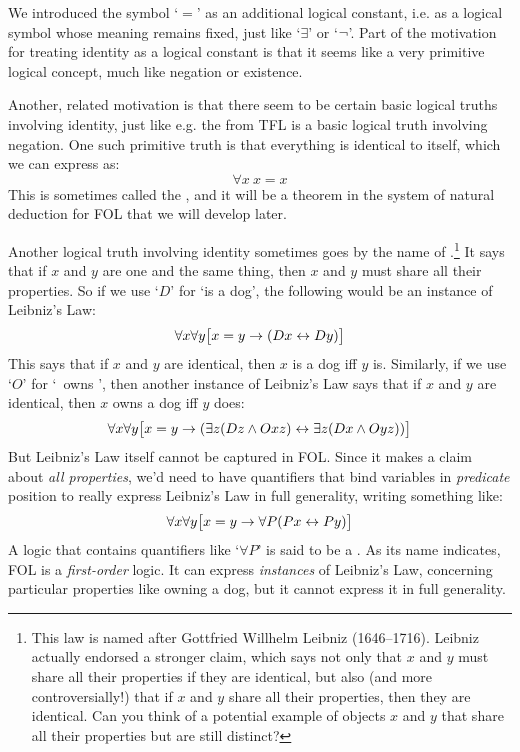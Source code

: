 We introduced the symbol `$=$' as an additional logical constant, i.e. as a logical symbol whose meaning remains fixed, just like `$\exists$' or `$\neg$'.  Part of the motivation for treating identity as a logical constant is that it seems like a very primitive logical concept, much like negation or existence.

Another, related motivation is that there seem to be certain basic logical truths involving identity, just like e.g. the  from TFL  is a basic logical truth involving negation.  One such primitive truth is that everything is identical to itself, which we can express as:
$$\forall x\ x= x$$
This is sometimes called the , and it will be a theorem in the system of natural deduction for FOL that we will develop later.

Another logical truth involving identity sometimes goes by the name of .\footnote{This law is named after Gottfried Willhelm Leibniz (1646--1716).  Leibniz actually endorsed a stronger claim, which says not only that $x$ and $y$ must share all their properties if they are identical, but also (and more controversially!) that if $x$ and $y$ share all their properties, then they are identical.  Can you think of a potential example of objects $x$ and $y$ that share all their properties but are still distinct?}  It says that if $x$ and $y$ are one and the same thing, then $x$ and $y$ must share all their properties. So if we use `$D$' for `\blank is a dog', the following would be an instance of Leibniz's Law:
$$\forall x \forall y\bigl[x = y \rightarrow (Dx \leftrightarrow Dy)\bigr]$$
This says that if $x$ and $y$ are identical, then $x$ is a dog iff $y$ is.  Similarly, if we use `$O$' for `\blank\ owns \blank', then another instance of Leibniz's Law says that if $x$ and $y$ are identical, then $x$ owns a dog iff $y$ does:
$$\forall x \forall y\bigl[x = y \rightarrow (\exists z(Dz \wedge Oxz) \leftrightarrow \exists z(Dx \wedge Oyz))\bigr]$$
But Leibniz's Law itself cannot be captured in FOL.  Since it makes a claim about \emph{all properties}, we'd need to have quantifiers that bind variables in \emph{predicate} position to really express Leibniz's Law in full generality, writing something like:
$$\forall x \forall y\bigl[x = y \rightarrow \forall P(Px \leftrightarrow Py)\bigr]$$
A logic that contains quantifiers like `$\forall P$' is said to be a .  As its name indicates, FOL is a \emph{first-order} logic.  It can express  \emph{instances} of Leibniz's Law, concerning particular properties like owning a dog, but it cannot express it in full generality.

